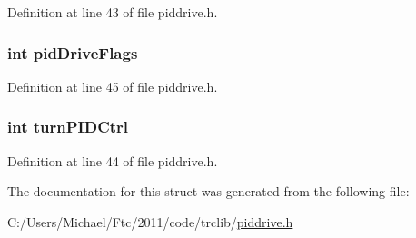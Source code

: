 Definition at line 43 of file piddrive.h.

\hypertarget{struct_p_i_d_d_r_i_v_e_a0519325409baca0bbad955a014bfdcad}{
\subsubsection[{pidDriveFlags}]{\setlength{\rightskip}{0pt plus 5cm}int {\bf pidDriveFlags}}}
\label{struct_p_i_d_d_r_i_v_e_a0519325409baca0bbad955a014bfdcad}


Definition at line 45 of file piddrive.h.

\hypertarget{struct_p_i_d_d_r_i_v_e_a48733e2c74e55078449a4b3807a4989a}{
\subsubsection[{turnPIDCtrl}]{\setlength{\rightskip}{0pt plus 5cm}int {\bf turnPIDCtrl}}}
\label{struct_p_i_d_d_r_i_v_e_a48733e2c74e55078449a4b3807a4989a}


Definition at line 44 of file piddrive.h.



The documentation for this struct was generated from the following file:\begin{DoxyCompactItemize}
\item 
C:/Users/Michael/Ftc/2011/code/trclib/\hyperlink{piddrive_8h}{piddrive.h}\end{DoxyCompactItemize}
